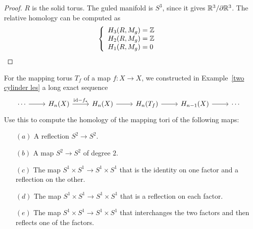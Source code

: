 \begin{proof}
$R$ is the solid torus. The guled manifold is $S^3$, since it gives $\mathbb{R}^3/\partial\mathbb{R}^3$. The relative homology can be computed as
\[\left\{\begin{array}{l}
H_3(R,M_g)=\mathbb{Z}\\
H_2(R,M_g)=\mathbb{Z}\\
H_1(R,M_g)=0
\end{array}\right. \]
\end{proof}
\begin{exercise}
For the mapping torus $T_f$ of a map $f:X\to X$, we constructed in Example~\ref{two cylinder les} a long exact sequence
\[\begin{tikzcd}
\cdots\ar[r]&H_n(X)\ar[r,"\mathrm{id}-f_*"]&H_n(X)\ar[r]&H_n(T_f)\ar[r]&H_{n-1}(X)\ar[r]&\cdots
\end{tikzcd}\]
Use this to compute the homology of the mapping tori of the following maps:
\begin{itemize}
\item[$(a)$]A reflection $S^2\to S^2$.
\item[$(b)$]A map $S^2\to S^2$ of degree $2$.
\item[$(c)$]The map $S^1\times S^1\to S^1\times S^1$ that is the identity on one factor and a reflection on the other.
\item[$(d)$]The map $S^1\times S^1\to S^1\times S^1$ that is a reflection on each factor.
\item[$(e)$]The map $S^1\times S^1\to S^1\times S^1$ that interchanges the two factors and then reflects one of the factors.
\end{itemize}
\end{exercise}
